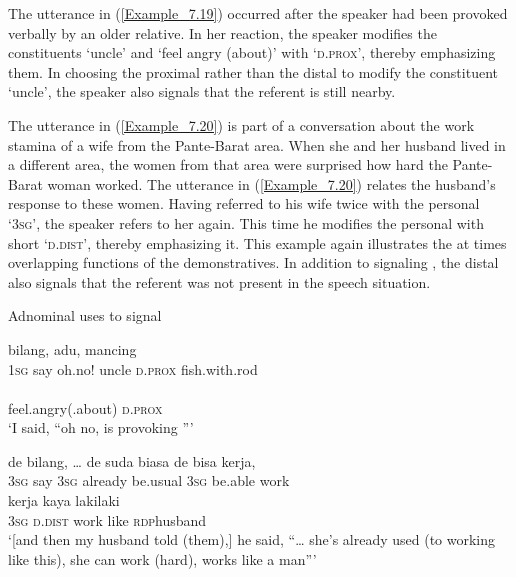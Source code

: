 {The utterance in (\ref{Example_7.19}) occurred after the speaker had been provoked verbally by an older relative. In her reaction, the speaker modifies the constituents  ‘uncle’ and  ‘feel angry (about)’ with  ‘\textsc{d.prox}’, thereby emphasizing them. In choosing the proximal rather than the distal  to modify the constituent  ‘uncle’, the speaker also signals that the referent is still nearby.



The utterance in (\ref{Example_7.20}) is part of a conversation about the work stamina of a wife from the Pante-Barat area. When she and her husband lived in a different area, the women from that area were surprised how hard the Pante-Barat woman worked. The utterance in (\ref{Example_7.20}) relates the husband’s response to these women. Having referred to his wife twice with the personal   ‘\textsc{3sg}’, the speaker refers to her again. This time he modifies the personal  with short  ‘\textsc{d.dist}’, thereby emphasizing it. This example again illustrates the at times overlapping functions of the demonstratives. In addition to signaling , the distal  also signals that the referent was not present in the speech situation.


\begin{styleExampleTitle}
Adnominal uses to signal 
\end{styleExampleTitle}

\ea
\label{Example_7.19}
 {bilang,} {{adu,}} {} {} {mancing}\\ %
 \textsc{1sg}  say  {oh.no!}  uncle  \textsc{d.prox}  fish.with.rod\\
  {}\\
 {feel.angry(.about)}  {\textsc{d.prox}}\\
 ‘I said, ``oh no, \bluebold{)} is provoking \bluebold{)}''' \textstyleExampleSource{[081025-008-Cv.0124]}
\z

\ea
\label{Example_7.20}
\gll {\ldots} {{de}} {{bilang,}} {\ldots} {de} {{suda}} {biasa} {de} {bisa} {kerja,}\\ %
  {}  {\textsc{3sg}} {say}  { }   \textsc{3sg}  {already}  be.usual  \textsc{3sg}  be.able  work\\
  {}  {kerja}  {kaya}  {laki{\Tilde}laki}\\
 {\textsc{3sg}}  {\textsc{d.dist}}  {work}  {like}  {\textsc{rdp}{\Tilde}husband}\\
\glt 
‘[and then my husband told (them),] he said, ``{\ldots} she’s already used (to working like this), she can work (hard), \bluebold{)} works like a man''' \textstyleExampleSource{[081014-007-CvEx.0049-0050]}
\z


}
